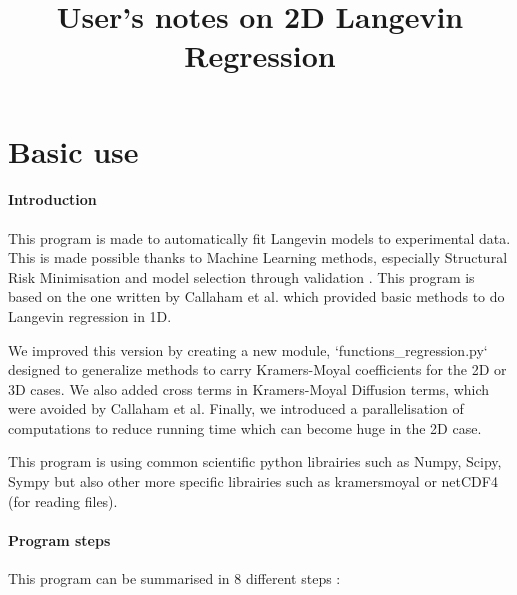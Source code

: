 \documentclass[A4paper]{article}
\title{User's notes on 2D Langevin Regression}
\begin{document}
\maketitle

\section{Basic use}
\paragraph{Introduction}
This program is made to automatically fit Langevin models to experimental data. This is made possible thanks to Machine Learning methods, especially Structural Risk Minimisation and model selection through validation \cite{Shalev2014}. This program is based on the one written by Callaham et al. \cite{Callaham2021nonlinear} which provided basic methods to do Langevin regression in 1D.

We improved this version by creating a new module, `functions\_regression.py` designed to generalize methods to carry Kramers-Moyal coefficients for the 2D or 3D cases. We also added cross terms in Kramers-Moyal Diffusion terms, which were avoided by Callaham et al. Finally, we introduced a parallelisation of computations to reduce running time which can become huge in the 2D case.

This program is using common scientific python librairies such as Numpy, Scipy, Sympy but also other more specific librairies such as kramersmoyal or netCDF4 (for reading files).

\paragraph{Program steps}
This program can be summarised in 8 different steps :
\end{document}

